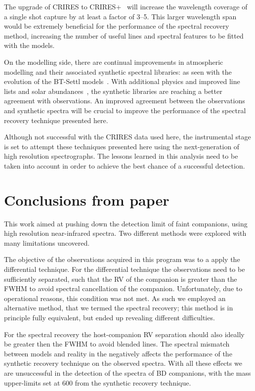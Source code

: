 The upgrade of CRIRES to CRIRES+~\citep{dorn_crires_2016} will increase the wavelength coverage of a single shot capture by at least a factor of 3--5.
This larger wavelength span would be extremely beneficial for the \textchisquared{} performance of the spectral recovery method, increasing the number of useful lines and spectral features to be fitted with the models.

On the modelling side, there are continual improvements in atmospheric modelling and their associated synthetic spectral libraries: as seen with the evolution of the {BT-Settl} models~\cite{allard_btsettl_2013}.
With additional physics and improved line lists and solar abundances~\citep [e.g.][]{asplund_chemical_2009,caffau_solar_2011}, the synthetic libraries are reaching a better agreement with \nir{} observations.
An improved agreement between the \nir{} observations and synthetic spectra will be crucial to improve the performance of the spectral recovery technique presented here.

Although not successful with the CRIRES data used here, the instrumental stage is set to attempt these techniques presented here using the next-generation of high resolution spectrographs.
The lessons learned in this analysis need to be taken into account in order to achieve the best chance of a successful detection.


\section{Conclusions from paper}
\label{sec:conclusionsfrom paper}
This work aimed at pushing down the detection limit of faint companions, using high resolution near-infrared spectra.
Two different methods were explored with many limitations uncovered.

The objective of the observations acquired in this program was to a apply the differential technique.
For the differential technique the observations need to be sufficiently separated, such that the {RV} of the companion is greater than the {FWHM} to avoid spectral cancellation of the companion.
Unfortunately, due to operational reasons, this condition was not met.
As such \textrm{we} employed an alternative method, that \textrm{we} termed the spectral recovery; this method is in principle fully equivalent, but ended up revealing different difficulties.

For the spectral recovery the host-companion {RV} separation should also ideally be greater then the {FWHM} to avoid blended lines.
The spectral mismatch between models and reality in the \nir{} negatively affects the performance of the synthetic recovery technique on the observed spectra.
With all these effects \textrm{we} are unsuccessful in the detection of the \nir{} spectra of {BD} companions,  with the mass upper-limits set at 600\Mjup{} from the synthetic recovery technique.

